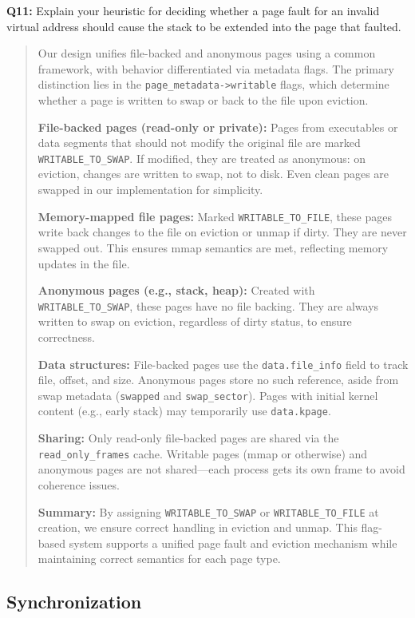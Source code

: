 \documentclass[a4paper,11pt]{paper}
\begin{document}
\textbf{Q11:} Explain your heuristic for deciding whether a page fault for an invalid virtual address should cause the stack to be extended into the page that faulted.
\begin{quote}
  Our design unifies file-backed and anonymous pages using a common framework, with behavior differentiated via metadata flags. The primary distinction lies in the \texttt{page\_metadata->writable} flags, which determine whether a page is written to swap or back to the file upon eviction.

\textbf{File-backed pages (read-only or private):}  
Pages from executables or data segments that should not modify the original file are marked \texttt{WRITABLE\_TO\_SWAP}. If modified, they are treated as anonymous: on eviction, changes are written to swap, not to disk. Even clean pages are swapped in our implementation for simplicity.

\textbf{Memory-mapped file pages:}  
Marked \texttt{WRITABLE\_TO\_FILE}, these pages write back changes to the file on eviction or unmap if dirty. They are never swapped out. This ensures mmap semantics are met, reflecting memory updates in the file.

\textbf{Anonymous pages (e.g., stack, heap):}  
Created with \texttt{WRITABLE\_TO\_SWAP}, these pages have no file backing. They are always written to swap on eviction, regardless of dirty status, to ensure correctness.

\textbf{Data structures:}  
File-backed pages use the \texttt{data.file\_info} field to track file, offset, and size. Anonymous pages store no such reference, aside from swap metadata (\texttt{swapped} and \texttt{swap\_sector}). Pages with initial kernel content (e.g., early stack) may temporarily use \texttt{data.kpage}.

\textbf{Sharing:}  
Only read-only file-backed pages are shared via the \texttt{read\_only\_frames} cache. Writable pages (mmap or otherwise) and anonymous pages are not shared—each process gets its own frame to avoid coherence issues.

\textbf{Summary:}  
By assigning \texttt{WRITABLE\_TO\_SWAP} or \texttt{WRITABLE\_TO\_FILE} at creation, we ensure correct handling in eviction and unmap. This flag-based system supports a unified page fault and eviction mechanism while maintaining correct semantics for each page type.

\end{quote}

\subsection{Synchronization}
\end{document}
